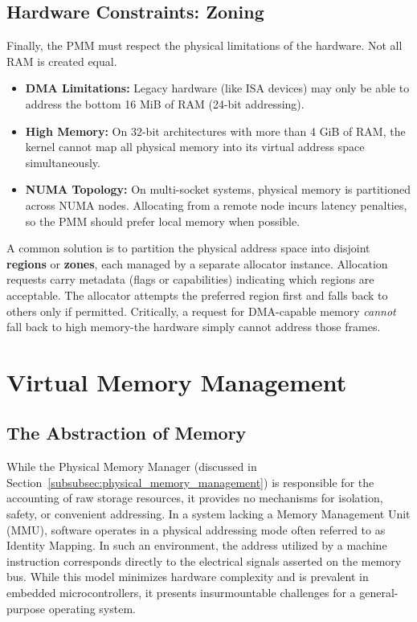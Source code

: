 \documentclass[a4paper,10pt,twoside]{report}
\theoremstyle{definition}
\begin{document}
\subsection{Hardware Constraints: Zoning}

Finally, the PMM must respect the physical limitations of the hardware. Not all RAM is created equal.
\begin{itemize}
    \item \textbf{DMA Limitations:} Legacy hardware (like ISA devices) may only be able to address the bottom 16 MiB of RAM (24-bit addressing).
    \item \textbf{High Memory:} On 32-bit architectures with more than 4 GiB of RAM, the kernel cannot map all physical memory into its virtual address space simultaneously.
    \item \textbf{NUMA Topology:} On multi-socket systems, physical memory is partitioned across NUMA nodes. Allocating from a remote node incurs latency penalties, so the PMM should prefer local memory when possible.
\end{itemize}

A common solution is to partition the physical address space into disjoint \textbf{regions} or \textbf{zones}, each managed by a separate allocator instance. Allocation requests carry metadata (flags or capabilities) indicating which regions are acceptable. The allocator attempts the preferred region first and falls back to others only if permitted. Critically, a request for DMA-capable memory \textit{cannot} fall back to high memory-the hardware simply cannot address those frames.

\section{Virtual Memory Management}
\label{sec:vmm}

\subsection{The Abstraction of Memory}
\label{subsec:vmm_abstraction}

While the Physical Memory Manager (discussed in Section~\ref{subsubsec:physical_memory_management}) is responsible for the accounting of raw storage resources, it provides no mechanisms for isolation, safety, or convenient addressing. In a system lacking a Memory Management Unit (MMU), software operates in a physical addressing mode often referred to as Identity Mapping. In such an environment, the address utilized by a machine instruction corresponds directly to the electrical signals asserted on the memory bus. While this model minimizes hardware complexity and is prevalent in embedded microcontrollers, it presents insurmountable challenges for a general-purpose operating system.
\end{document}
